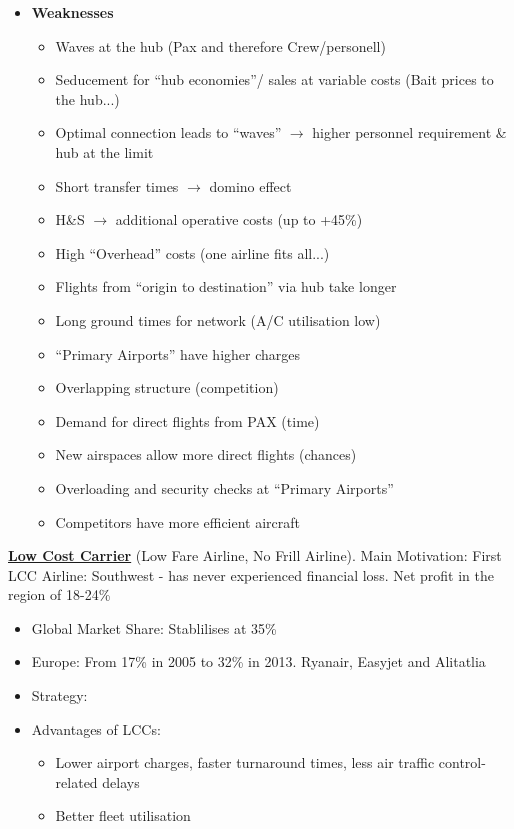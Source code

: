 \documentclass[9pt, landscape, fleqn]{scrartcl}
\begin{document}
\begin{multicols*}{3}
\begin{itemize}
    \item \textbf{Weaknesses}
    \begin{itemize}
        \item Waves at the hub (Pax and therefore Crew/personell)
        \item Seducement for “hub economies”/ sales at variable costs (Bait prices to the hub...)
        \item Optimal connection leads to “waves” $\rightarrow$ higher personnel requirement \& hub at the limit
        \item Short transfer times $\rightarrow$ domino effect
        \item H\&S $\rightarrow$ additional operative costs (up to +45\%)
        \item High “Overhead” costs (one airline fits all...)
        \item Flights from “origin to destination” via hub take longer
        \item Long ground times for network (A/C utilisation low)
        \item “Primary Airports” have higher charges
        \item Overlapping structure (competition)
        \item Demand for direct flights from PAX (time)
        \item New airspaces allow more direct flights (chances)
        \item Overloading and security checks at “Primary Airports”
        \item Competitors have more efficient aircraft
    \end{itemize}
\end{itemize}
\underline{\textbf{Low Cost Carrier}} (Low Fare Airline, No Frill Airline). Main Motivation: First LCC Airline: Southwest - has never experienced financial loss. Net profit in the region of 18-24\%
\begin{itemize}
    \item Global Market Share: Stablilises at 35\% 
    \item Europe: From 17\% in 2005 to 32\% in 2013. Ryanair, Easyjet and Alitatlia 
    \item Strategy: 
    \item Advantages of LCCs:
    \begin{itemize}
        \item Lower airport charges, faster turnaround times, less air traffic control-related delays 
        \item Better fleet utilisation 

\end{itemize}
\end{itemize}
\end{multicols*}
\end{document}
